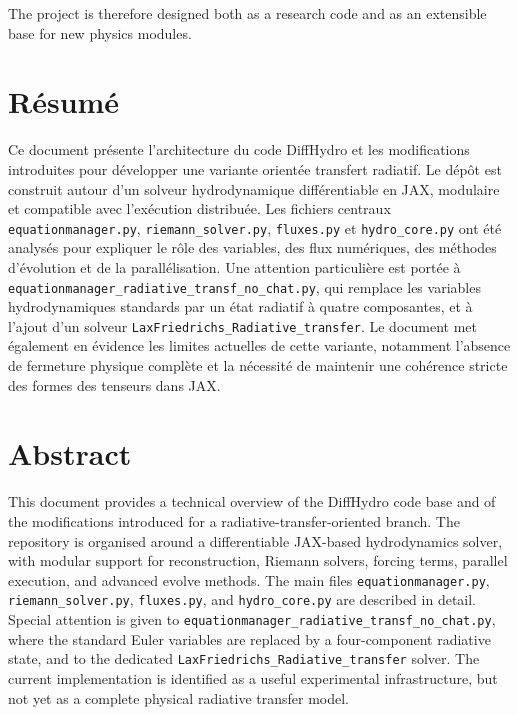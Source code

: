 \documentclass[a4paper, 11pt]{article}
\begin{document}
The project is therefore designed both as a research code and as an extensible base for new physics modules.

\newpage



\newpage
\thispagestyle{empty}
\pagestyle{headings}

\section*{Résumé}

Ce document présente l'architecture du code DiffHydro et les modifications introduites pour développer une variante orientée transfert radiatif. Le dépôt est construit autour d'un solveur hydrodynamique différentiable en JAX, modulaire et compatible avec l'exécution distribuée. Les fichiers centraux \texttt{equationmanager.py}, \texttt{riemann\_solver.py}, \texttt{fluxes.py} et \texttt{hydro\_core.py} ont été analysés pour expliquer le rôle des variables, des flux numériques, des méthodes d'évolution et de la parallélisation. Une attention particulière est portée à \texttt{equationmanager\_radiative\_transf\_no\_chat.py}, qui remplace les variables hydrodynamiques standards par un état radiatif à quatre composantes, et à l'ajout d'un solveur \texttt{LaxFriedrichs\_Radiative\_transfer}. Le document met également en évidence les limites actuelles de cette variante, notamment l'absence de fermeture physique complète et la nécessité de maintenir une cohérence stricte des formes des tenseurs dans JAX.

\section*{Abstract}

This document provides a technical overview of the DiffHydro code base and of the modifications introduced for a radiative-transfer-oriented branch. The repository is organised around a differentiable JAX-based hydrodynamics solver, with modular support for reconstruction, Riemann solvers, forcing terms, parallel execution, and advanced evolve methods. The main files \texttt{equationmanager.py}, \texttt{riemann\_solver.py}, \texttt{fluxes.py}, and \texttt{hydro\_core.py} are described in detail. Special attention is given to \texttt{equationmanager\_radiative\_transf\_no\_chat.py}, where the standard Euler variables are replaced by a four-component radiative state, and to the dedicated \texttt{LaxFriedrichs\_Radiative\_transfer} solver. The current implementation is identified as a useful experimental infrastructure, but not yet as a complete physical radiative transfer model.
\end{document}
